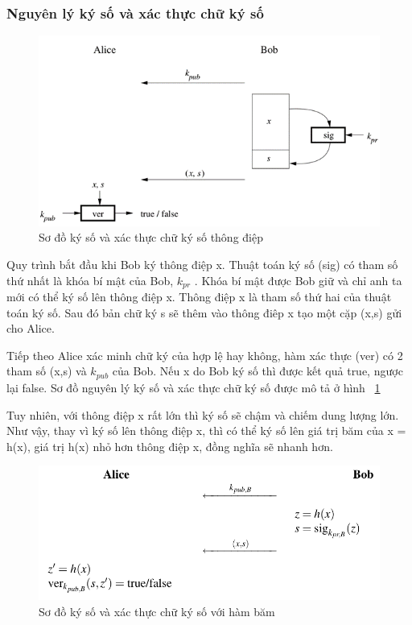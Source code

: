 \subsubsection{Nguyên lý ký số và xác thực chữ ký số }

\begin{figure}[htbp]
\centering
\includegraphics[width=.9\linewidth]{img/dig_sig.png}
\caption{Sơ đồ ký số và xác thực chữ ký số thông điệp}
\label{fig:dig_sig}
\end{figure}

Quy trình bắt đầu khi Bob ký thông điệp x. Thuật toán ký số (sig) có tham số thứ nhất là khóa bí mật của Bob, $k_{pr}$ . Khóa bí mật được Bob giữ và chỉ anh ta mới có thể ký số lên thông điệp x. Thông điệp x là tham số thứ hai của thuật toán ký số. Sau đó bản chữ ký s sẽ thêm vào thông điêp x tạo một cặp (x,s) gửi cho Alice.
 
Tiếp theo Alice xác minh chữ ký của hợp lệ hay không, hàm xác thực (ver) có 2 tham số (x,s) và $k_{pub}$  của Bob. Nếu x do Bob ký số thì được kết quả true, ngược lại false.
Sơ đồ nguyên lý ký số và xác thực chữ ký số được mô tả ở hình ~\ref{fig:dig_sig}

Tuy nhiên, với thông điệp x rất lớn thì ký số sẽ chậm và chiếm dung lượng lớn. Như vậy, thay vì ký số lên thông điệp x, thì có thể ký số lên giá trị băm của x = h(x), giá trị h(x) nhỏ hơn thông điệp x, đồng nghĩa sẽ nhanh hơn. 

\begin{figure}[htbp]
\centering
\includegraphics[width=.9\linewidth]{img/dig_sig_hash.png}
\caption{Sơ đồ ký số và xác thực chữ ký số với hàm băm}
\label{fig:dig_sig_hash}
\end{figure}

